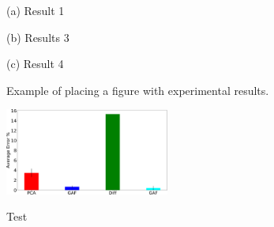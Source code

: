 \documentclass{article}
\begin{document}
\begin{figure}[htb]

\begin{minipage}[b]{1.0\linewidth}
  \centering
  \vspace{2.0cm}
  \centerline{(a) Result 1}\medskip
\end{minipage}
%
\begin{minipage}[b]{.48\linewidth}
  \centering
  \vspace{1.5cm}
  \centerline{(b) Results 3}\medskip
\end{minipage}
\hfill
\begin{minipage}[b]{0.48\linewidth}
  \centering
  \vspace{1.5cm}
  \centerline{(c) Result 4}\medskip
\end{minipage}
%
\caption{Example of placing a figure with experimental results.}
\label{fig:res}
%
\end{figure}

\begin{figure}
 \includegraphics[width=0.48\textwidth]{results-crop.pdf}
 \label{fig:results}
 \caption{Test}
\end{figure}
\end{document}
